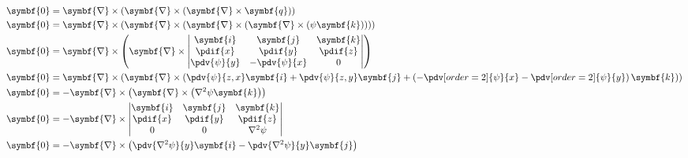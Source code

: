 \documentclass{article}
\theoremstyle{definition}
\begin{document}
\begin{align*}
    \symbf{0} & = \symbf{\nabla} \times \left( \symbf{\nabla} \times \left( \symbf{\nabla} \times \symbf{q} \right) \right)                                                          \\
    \symbf{0} & = \symbf{\nabla} \times \left( \symbf{\nabla} \times \left( \symbf{\nabla} \times \left( \symbf{\nabla} \times \left( \psi \symbf{k} \right) \right) \right) \right) \\
    \symbf{0} & = \symbf{\nabla} \times \left( \symbf{\nabla} \times
    \begin{vmatrix}
        \symbf{i}                   & \symbf{j}                    & \symbf{k}              \\
        \displaystyle \pdif{x}      & \displaystyle \pdif{y}       & \displaystyle \pdif{z} \\
        \displaystyle \pdv{\psi}{y} & \displaystyle -\pdv{\psi}{x} & 0
    \end{vmatrix}
    \right)                                                                                                                                                                          \\
    \symbf{0} & = \symbf{\nabla} \times \left( \symbf{\nabla} \times
    \left( \pdv{\psi}{z,x} \symbf{i} + \pdv{\psi}{z,y} \symbf{j} + \left( - \pdv[order=2]{\psi}{x} - \pdv[order=2]{\psi}{y} \right) \symbf{k} \right)
    \right)                                                                                                                                                                          \\
    \symbf{0} & = - \symbf{\nabla} \times \left( \symbf{\nabla} \times \left( \nabla^2 \psi \symbf{k} \right) \right)                                                                \\
    \symbf{0} & = - \symbf{\nabla} \times
    \begin{vmatrix}
        \symbf{i}              & \symbf{j}              & \symbf{k}              \\
        \displaystyle \pdif{x} & \displaystyle \pdif{y} & \displaystyle \pdif{z} \\
        0                      & 0                      & \nabla^2 \psi
    \end{vmatrix}
    \\
    \symbf{0} & = - \symbf{\nabla} \times
    \left( \pdv{\nabla^2 \psi}{y} \symbf{i} - \pdv{\nabla^2 \psi}{y} \symbf{j} \right)
    \\

\end{align*}
\end{document}
